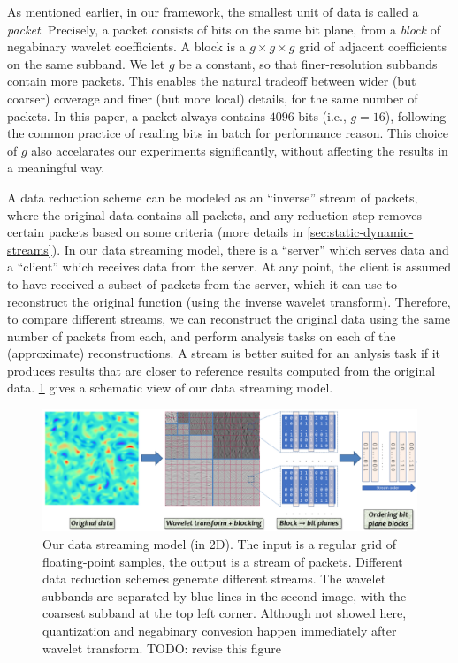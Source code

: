 As mentioned earlier, in our framework, the smallest unit of data is called a \emph{packet}.
Precisely, a packet consists of bits on the same bit plane, from a \emph{block} of negabinary
wavelet coefficients. A block is a $g\times g\times g$ grid of adjacent coefficients on the same
subband. We let $g$ be a constant, so that finer-resolution subbands contain more packets. This
enables the natural tradeoff between wider (but coarser) coverage and finer (but more local)
details, for the same number of packets. In this paper, a packet always contains $4096$ bits (i.e.,
$g=16$), following the common practice of reading bits in batch for performance reason. This choice
of $g$ also accelarates our experiments significantly, without affecting the results in a meaningful
way.

A data reduction scheme can be modeled as an ``inverse'' stream of packets, where the original data
contains all packets, and any reduction step removes certain packets based on some criteria (more
details in \cref{sec:static-dynamic-streams}). In our data streaming model, there is a ``server''
which serves data and a ``client'' which receives data from the server. At any point, the client is
assumed to have received a subset of packets from the server, which it can use to reconstruct the
original function (using the inverse wavelet transform). Therefore, to compare different streams, we
can reconstruct the original data using the same number of packets from each, and perform analysis
tasks on each of the (approximate) reconstructions. A stream is better suited for an anlysis task if
it produces results that are closer to reference results computed from the original data.
\cref{fig:pipeline} gives a schematic view of our data streaming model.

\begin{figure}[h]
  \centering
  \includegraphics[width=\linewidth]{img/pipeline.png}
  \caption{Our data streaming model (in 2D). The input is a regular grid of floating-point samples,
  the output is a stream of packets. Different data reduction schemes generate different streams.
  The wavelet subbands are separated by blue lines in the second image, with the coarsest subband at
  the top left corner. Although not showed here, quantization and negabinary convesion happen
  immediately after wavelet transform. TODO: revise this figure}\label{fig:pipeline}
\end{figure}

